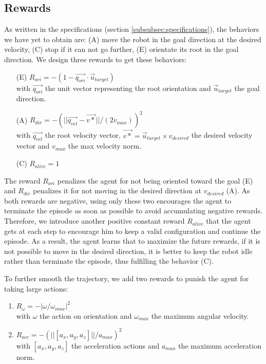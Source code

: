 \subsection{Rewards}
As written in the specifications (section \ref{subsubsec:specifications}), the behaviors we have yet to obtain are: (A) move the robot in the goal direction at the desired velocity, (C) stop if it can not go further, (E) orientate its root in the goal direction. 
We design three rewards to get these behaviors:
\begin{enumerate}
  \item[(E)] $R_{ori} = -( 1 -  \overrightarrow{q_{ori}} \cdot \overrightarrow{u}_{target} )$ \\
  with $\overrightarrow{q_{ori}}$ the unit vector representing the root orientation and $\overrightarrow{u}_{target}$ the goal direction.
  \item[(A)] $R_{dir} = -( ||\overrightarrow{q_{vel}} - \overrightarrow{v*} ||/(2v_{max}) )^2$\\
  with $\overrightarrow{q_{vel}}$ the root velocity vector, $\overrightarrow{v*}=\overrightarrow{u}_{target} \times v_{desired}$ the desired velocity vector and $v_{max}$ the max velocity norm.
  \item[(C)] $R_{alive} = 1$ 
\end{enumerate}
The reward $R_{ori}$ penalizes the agent for not being oriented toward the goal (E) and $R_{dir}$ penalizes it for not moving in the desired direction at $v_{desired}$ (A). 
As both rewards are negative, using only these two encourages the agent to terminate the episode as soon as possible to avoid accumulating negative rewards. 
Therefore, we introduce another positive constant reward $R_{alive}$ that the agent gets at each step to encourage him to keep a valid configuration and continue the episode.
As a result, the agent learns that to maximize the future rewards, if it is not possible to move in the desired direction, it is better to keep the robot idle rather than terminate the episode, thus fulfilling the behavior (C).

To further smooth the trajectory, we add two rewards to punish the agent for taking large actions:
\begin{enumerate}
    \item $R_{\omega} = - | \omega / \omega_{max} |^2 $ \\
    with $\omega$ the action on orientation and $\omega_{max}$ the maximum angular velocity.
    \item $R_{acc} = - (|| [a_{x},a_{y},a_{z}] || / a_{max})^2 $ \\
    with $[a_{x},a_{y},a_{z}]$ the acceleration actions and $a_{max}$ the maximum acceleration norm.
\end{enumerate}

